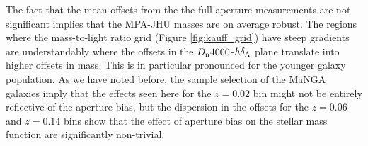 The fact that the mean offsets from the the full aperture measurements are not significant implies that the MPA-JHU masses are on average robust. The regions where the mass-to-light ratio grid (Figure \ref{fig:kauff_grid}) have steep gradients are understandably where the offsets in the $D_{\rm n}4000$-$h\delta_{\rm A}$ plane translate into higher offsets in mass. This is in particular pronounced for the younger galaxy population. As we have noted before, the sample selection of the MaNGA galaxies imply that the effects seen here for the $z = 0.02$ bin might not be entirely reflective of the aperture bias, but the dispersion in the offsets for the $z = 0.06$ and $z = 0.14$ bins show that the effect of aperture bias on the stellar mass function are significantly non-trivial.










